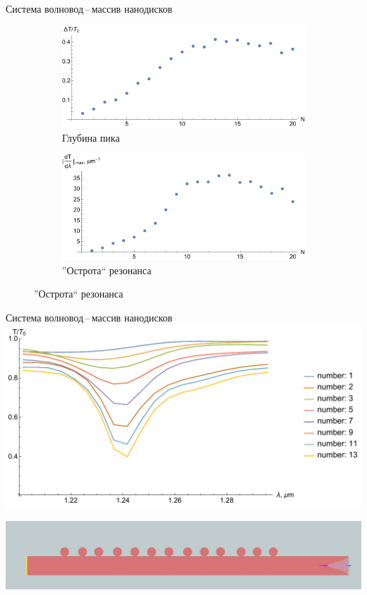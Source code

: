 \begin{frame}{Система волновод\,--\,массив нанодисков}
	\begin{figure}[h]
		\centering
		\begin{subfigure}[b]{.7\textwidth}
			\includegraphics[width=\textwidth]{img/dTPlot-presentation}
			\caption{Глубина пика}
			\label{fig:metrics_dT}
		\end{subfigure}
		\begin{subfigure}[b]{.75\textwidth}
			\includegraphics[width=\textwidth]{img/dTdλPlot-presentation}
			\caption{''Острота`` резонанса}
			\label{fig:metrics_dTdLambda}
		\end{subfigure}
	\end{figure}
\end{frame}
\begin{frame}{Система волновод\,--\,массив нанодисков}
	\includegraphics[width=\textwidth]{img/total}
	
	\includegraphics[width=\textwidth]{img/view_xy_13}
\end{frame}